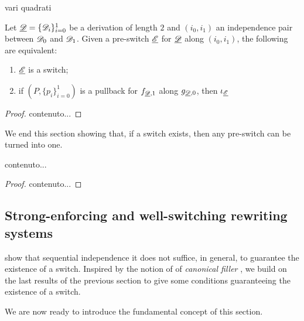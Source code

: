 \begin{remark} 
vari quadrati
\end{remark} 

\begin{lemma}

Let $\underline{\mathscr{D}}=\{\mathscr{D}_{i}\}_{i=0}^1$ be a derivation of length $2$ and $(i_0, i_1)$ an independence pair between $\mathscr{D}_0$ and $\mathscr{D}_1$. Given a pre-switch $\underline{\mathscr{E}}$ for $\underline{\mathscr{D}}$ along $(i_0, i_1)$, the following are equivalent:
	\begin{enumerate}
		\item $\underline{\mathscr{E}}$ is a switch;
		\item if $(P, \{p_i\}_{i=0}^1)$ is a pullback for $f_{\underline{\mathscr{D}},1}$ along $g_{\underline{\mathscr{D}},0}$, then $\iota_{\underline{\mathscr{E}}}$
	\end{enumerate}
\end{lemma}
\begin{proof}
	contenuto...
\end{proof}

We end this section showing that, if a switch exists, then any pre-switch can be turned into one.

\begin{proposition}
	contenuto...
\end{proposition}
\begin{proof}
	contenuto...
\end{proof}


\subsection{Strong-enforcing and well-switching rewriting systems}

 show that sequential independence it does not suffice, in general, to guarantee the existence of a switch.  Inspired by the notion of of \emph{canonical filler}
\cite{heindel2009category}, we build on the last results of the previous section to give some conditions guaranteeing the existence of a switch. 




We are now ready to introduce the fundamental concept of this section.

